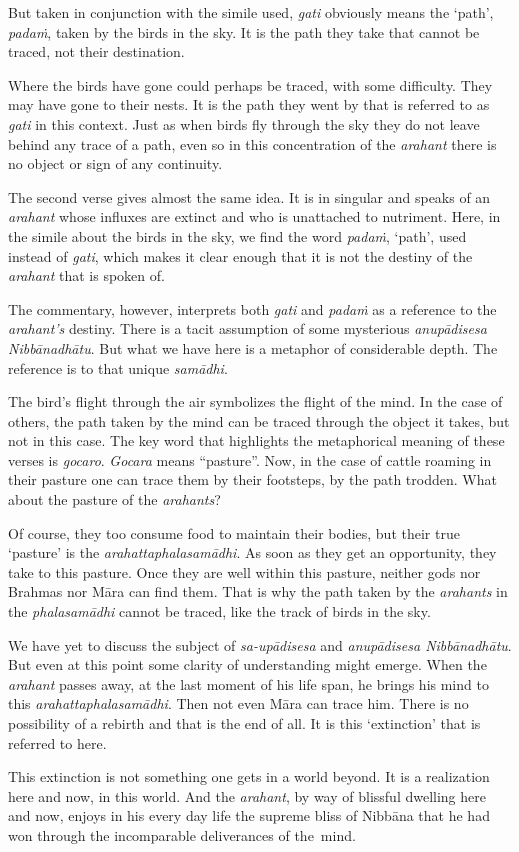 But taken in conjunction with the simile used, \emph{gati} obviously means the `path', \emph{padaṁ}, taken by the birds in the sky. It is the path they take that cannot be traced, not their destination.

Where the birds have gone could perhaps be traced, with some difficulty. They may have gone to their nests. It is the path they went by that is referred to as \emph{gati} in this context. Just as when birds fly through the sky they do not leave behind any trace of a path, even so in this concentration of the \emph{arahant} there is no object or sign of any continuity.

The second verse gives almost the same idea. It is in singular and speaks of an \emph{arahant} whose influxes are extinct and who is unattached to nutriment. Here, in the simile about the birds in the sky, we find the word \emph{padaṁ}, `path', used instead of \emph{gati}, which makes it clear enough that it is not the destiny of the \emph{arahant} that is spoken of.

The commentary, however, interprets both \emph{gati} and \emph{padaṁ} as a reference to the \emph{arahant's} destiny. There is a tacit assumption of some mysterious \emph{anupādisesa Nibbānadhātu}. But what we have here is a metaphor of considerable depth. The reference is to that unique \emph{samādhi}.

The bird's flight through the air symbolizes the flight of the mind. In the case of others, the path taken by the mind can be traced through the object it takes, but not in this case. The key word that highlights the metaphorical meaning of these verses is \emph{gocaro}. \emph{Gocara} means ``pasture''. Now, in the case of cattle roaming in their pasture one can trace them by their footsteps, by the path trodden. What about the pasture of the \emph{arahants}?

Of course, they too consume food to maintain their bodies, but their true `pasture' is the \emph{arahattaphalasamādhi}. As soon as they get an opportunity, they take to this pasture. Once they are well within this pasture, neither gods nor Brahmas nor Māra can find them. That is why the path taken by the \emph{arahants} in the \emph{phalasamādhi} cannot be traced, like the track of birds in the sky.

We have yet to discuss the subject of \emph{sa-upādisesa} and \emph{anupādisesa Nibbānadhātu}. But even at this point some clarity of understanding might emerge. When the \emph{arahant} passes away, at the last moment of his life span, he brings his mind to this \emph{arahattaphalasamādhi}. Then not even Māra can trace him. There is no possibility of a rebirth and that is the end of all. It is this `extinction' that is referred to here.

This extinction is not something one gets in a world beyond. It is a realization here and now, in this world. And the \emph{arahant}, by way of blissful dwelling here and now, enjoys in his every day life the supreme bliss of Nibbāna that he had won through the incomparable deliverances of the~mind.
